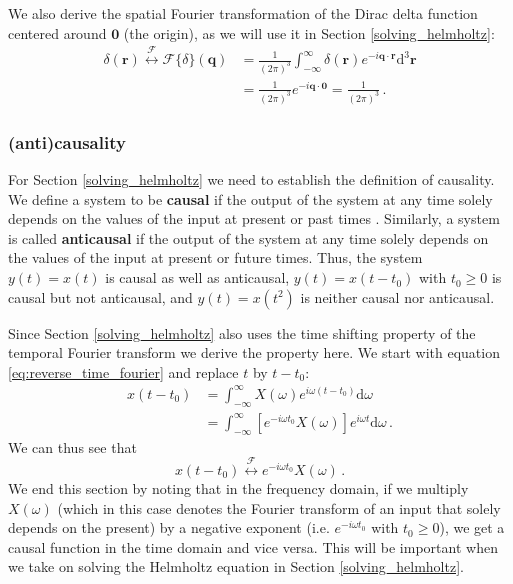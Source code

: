 We also derive the spatial Fourier transformation of the Dirac delta function centered around $\mathbf 0$ (the origin), as we will use it in Section \ref{solving_helmholtz}:
\begin{align}
    \delta(\mathbf r) \stackrel{\mathcal F}{\longleftrightarrow} \mathcal F \{\delta\}(\mathbf q) &= \frac{1}{(2\pi)^3} \int_{-\infty}^\infty \delta(\mathbf r) e^{-i\mathbf q \cdot \mathbf r} \mathrm d^3 \mathbf r \nonumber \\
    &= \frac{1}{(2\pi)^3} e^{-i\mathbf q \cdot \mathbf 0} = \frac{1}{(2\pi)^3} \,. \label{eq:fourier_delta}
\end{align}


\subsubsection{(anti)causality}
For Section \ref{solving_helmholtz} we need to establish the definition of causality.
We define a system to be \textbf{causal} if the output of the system at any time solely depends on the values of the input at present or past times \cite[Section 1.6.3]{signals_and_systems}.
Similarly, a system is called \textbf{anticausal} if the output of the system at any time solely depends on the values of the input at present or future times.
Thus, the system $y(t) = x(t)$ is causal as well as anticausal, $y(t) = x(t-t_0)$ with $t_0 \geq 0$ is causal but not anticausal, and $y(t) = x(t^2)$ is neither causal nor anticausal.

Since Section \ref{solving_helmholtz} also uses the time shifting property of the temporal Fourier transform \cite[Section 4.3.2]{signals_and_systems} we derive the property here.
We start with equation \ref{eq:reverse_time_fourier} and replace $t$ by $t-t_0$:
\begin{align}
    x(t-t_0) &= \int_{-\infty}^{\infty} X(\omega) e^{i\omega (t-t_0)} \mathrm d \omega \nonumber \\
             &= \int_{-\infty}^{\infty} \left[ e^{-i\omega t_0} X(\omega) \right] e^{i\omega t} \mathrm d \omega \,. \nonumber
\end{align}
We can thus see that
\begin{equation}
    x(t-t_0) \stackrel{\mathcal F}{\longleftrightarrow} e^{-i\omega t_0} X(\omega) \,. \label{eq:time_shift}
\end{equation}
We end this section by noting that in the frequency domain, if we multiply $X(\omega)$ (which in this case denotes the Fourier transform of an input that solely depends on the present) by a negative exponent (i.e. $e^{-i\omega t_0}$ with $t_0 \geq 0$), we get a causal function in the time domain and vice versa.
This will be important when we take on solving the Helmholtz equation in Section \ref{solving_helmholtz}.
